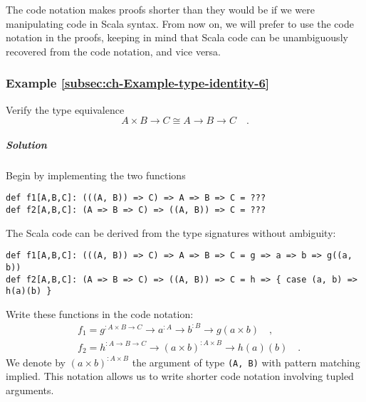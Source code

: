 The code notation makes proofs shorter than they would be if we were
manipulating code in Scala syntax. From now on, we will prefer to
use the code notation in the proofs, keeping in mind that Scala code
can be unambiguously recovered from the code notation, and vice versa.

\subsubsection{Example \label{subsec:ch-Example-type-identity-6}\ref{subsec:ch-Example-type-identity-6}}

Verify the type equivalence 
\[
A\times B\rightarrow C\cong A\rightarrow B\rightarrow C\quad.
\]


\subparagraph{Solution}

Begin by implementing the two functions
\begin{lstlisting}
def f1[A,B,C]: (((A, B)) => C) => A => B => C = ???
def f2[A,B,C]: (A => B => C) => ((A, B)) => C = ???
\end{lstlisting}
The Scala code can be derived from the type signatures without ambiguity:
\begin{lstlisting}
def f1[A,B,C]: (((A, B)) => C) => A => B => C = g => a => b => g((a, b))
def f2[A,B,C]: (A => B => C) => ((A, B)) => C = h => { case (a, b) => h(a)(b) }
\end{lstlisting}
Write these functions in the code notation:
\begin{align*}
 & f_{1}=g^{:A\times B\rightarrow C}\rightarrow a^{:A}\rightarrow b^{:B}\rightarrow g(a\times b)\quad,\\
 & f_{2}=h^{:A\rightarrow B\rightarrow C}\rightarrow\left(a\times b\right)^{:A\times B}\rightarrow h(a)(b)\quad.
\end{align*}
We denote by $\left(a\times b\right)^{:A\times B}$ the argument of
type \lstinline!(A, B)! with pattern matching implied. This notation
allows us to write shorter code notation involving tupled arguments.

